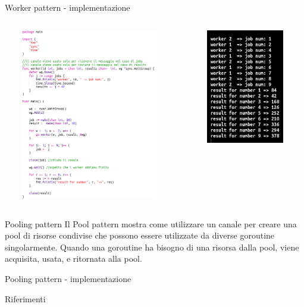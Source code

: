 \documentclass{beamer}
\begin{document}
\begin{frame}{Worker pattern - implementazione}
    
    \begin{columns}
    \begin{column}{0.6\textwidth}
        \centerline{\includegraphics[width=8.5cm,height=7.5cm, keepaspectratio]{screen3.png}}
    \end{column}
    
    \begin{column}{0.4\textwidth}
                \centerline{\includegraphics[width=6cm,height=5cm, keepaspectratio]{screen4.png}}
    \end{column}
    
    \end{columns}
\end{frame}

\begin{frame}{Pooling pattern}
\centering Il Pool pattern mostra come utilizzare un canale per creare una pool di risorse condivise che possono essere utilizzate da diverse goroutine singolarmente. \newline
Quando una goroutine ha bisogno di una risorsa dalla pool, viene acquisita,
usata, e ritornata alla pool.
\end{frame}


\begin{frame}{Pooling pattern - implementazione}
    
\end{frame}

\begin{frame}{Riferimenti}
    
\end{frame}
\end{document}

